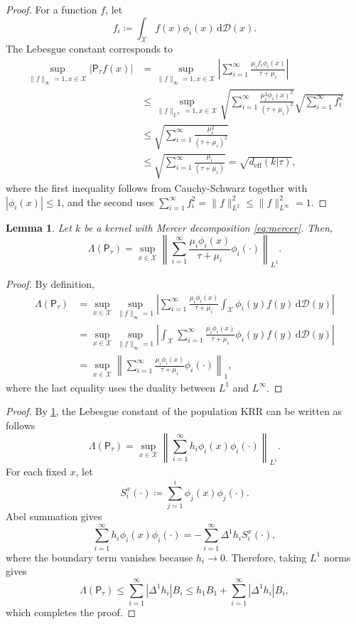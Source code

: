\documentclass{article}
\numberwithin{theorem}{section}
\newtheorem{lemma}[theorem]{Lemma}
\theoremstyle{definition}
\newcommand{\diff}{\text{d}}
\newcommand{\inpdist}{\Ds}
\newcommand{\Ds}{\mathcal D}
\newcommand{\Xs}{\mathcal X}
\begin{document}
\boundlebe*
\begin{proof}
    For a function $f$, let
    $$f_i\coloneqq\int_\Xs f(x)\phi_i(x)\,\diff \inpdist(x).$$
    The Lebesgue constant corresponds to
    \begin{align*}
        \sup_{\|f\|_{\infty}=1, x\in \Xs}|\mathsf{P}_{\tau}f(x)|&=\sup_{\|f\|_{\infty}=1, x\in \Xs}\left|\sum_{i=1}^\infty\frac{\mu_if_i\phi_i(x)}{\tau+\mu_i}\right|\\
        &\le \sup_{\|f\|_{L^\infty}=1, x\in \Xs}\sqrt{\sum_{i=1}^\infty\frac{\mu_i^2\phi_i(x)^2}{(\tau+\mu_i)^2}}\sqrt{\sum_{i=1}^\infty f_i^2}\\
        &\le  \sqrt{\sum_{i=1}^\infty\frac{\mu_i^2}{(\tau+\mu_i)^2}}\\
        &\le  \sqrt{\sum_{i=1}^\infty\frac{\mu_i}{(\tau+\mu_i)}}=\sqrt{d_\text{eff}(k|\tau)},
    \end{align*}
    where the first inequality follows from Cauchy-Schwarz together with $|\phi_i(x)|\le 1$, and the second uses $\sum_{i=1}^\infty f_i^2=\|f\|_{L^2}^2\le \|f\|_{L^\infty}^2=1$.
\end{proof}


\begin{lemma}\label{lem:lebegen}
    Let $k$ be a kernel with Mercer decomposition \eqref{eq:mercer}. Then,
    $$\Lambda(\mathsf{P}_{\tau})=\sup_{x\in \Xs}\left\|\sum_{i=1}^\infty \frac{\mu_i\phi_i(x)}{\tau+\mu_i}\phi_i(\cdot)\right \|_{L^1}.$$
\end{lemma}
\begin{proof}
    By definition,
    \begin{align*}
        \Lambda(\mathsf{P}_{\tau}) &= \sup_{x\in \Xs}\sup_{\|f\|_\infty=1}\left|\sum_{i=1}^\infty \frac{\mu_i\phi_i(x)}{\tau+\mu_i}\int_\Xs \phi_i(y)f(y)\,\diff \inpdist(y)\right|\\
        &= \sup_{x\in \Xs}\sup_{\|f\|_\infty=1}\left|\int_\Xs \sum_{i=1}^\infty \frac{\mu_i\phi_i(x)}{\tau+\mu_i} \phi_i(y)f(y)\,\diff \inpdist(y)\right|\\
        &=\sup_{x\in \Xs}\left\|\sum_{i=1}^\infty \frac{\mu_i\phi_i(x)}{\tau+\mu_i}\phi_i(\cdot)\right \|_{1},
    \end{align*}
    where the last equality uses the duality between $L^1$ and $L^\infty$.
\end{proof}



\lebker*
\begin{proof}
    By \cref{lem:lebegen}, the Lebesgue constant of the population KRR can be written as follows
    $$\Lambda(\mathsf{P}_{\tau})=\sup_{x\in \Xs}\left\|\sum_{i=1}^\infty h_i\phi_i(x)\phi_i(\cdot)\right \|_{L^1}.$$
    For each fixed $x$, let
    $$S_i^x(\cdot)\coloneqq \sum_{j=1}^i\phi_j(x)\phi_j(\cdot).$$
    Abel summation gives
    $$\sum_{i=1}^\infty h_i\phi_i(x)\phi_i(\cdot)=-\sum_{i=1}^\infty \Delta^1h_iS_i^x(\cdot),$$
    where the boundary term vanishes because $h_i\to 0$.
    Therefore, taking $L^1$ norms gives
    $$\Lambda(\mathsf{P}_{\tau})\le \sum_{i=1}^\infty \left|\Delta^1h_i\right|B_i\le h_1B_1+\sum_{i=1}^\infty \left|\Delta^1h_i\right|B_i,$$
    which completes the proof.
\end{proof}
\end{document}
